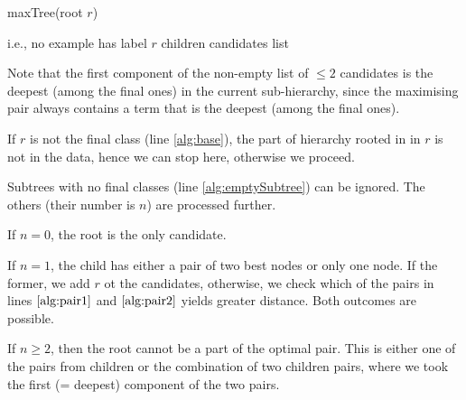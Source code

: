 \documentclass[12pt,a4paper]{article}
\begin{document}
\begin{algorithm}[H]
	\caption{maxTree(root $r$)}\label{alg:rec}
	\begin{algorithmic}[1]
		\label{alg:base}
			\hfill i.e., no example has label $r$
		\ENDIF
		\hfill children candidates list
			\label{alg:emptySubtree}
		\ENDFOR
			\ELSE
				\label{alg:pair1}
				\label{alg:pair2}
			\ENDIF
		\ELSE
		\ENDIF
	\end{algorithmic}  
\end{algorithm}
Note that the first component of the non-empty list of $\leq 2$ candidates is the deepest
(among the final ones) in the current sub-hierarchy, since the maximising pair always contains
 a term that is the deepest (among the final ones).
 
If $r$ is not the final class (line \ref{alg:base}), the part of hierarchy rooted in in $r$ is not in the data, hence we
can stop here, otherwise we proceed.

Subtrees with no final classes (line \ref{alg:emptySubtree}) can be ignored. The others (their number is $n$) are processed further.

If $n = 0$, the root is the only candidate.

If $n = 1$, the child has either a pair of two best nodes or only one node.
If the former, we add $r$ ot the candidates, otherwise, we check which of the pairs in lines $\ref{alg:pair1}$ and $\ref{alg:pair2}$
yields greater distance. Both outcomes are possible.

If $n \geq 2$, then the root cannot be a part of the optimal pair. This is either one of the pairs from children or
the combination of two children pairs, where we took the first (= deepest) component of the two pairs.
\end{document}
